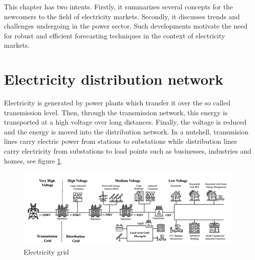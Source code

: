 
This chapter has two intents. Firstly, it summarizes several concepts for the newcomers to the field of electricity markets. Secondly, it discusses trends and challenges undergoing in the power sector. Such developments motivate the need for robust and efficient forecasting techniques in the context of electricity markets.


\section{Electricity distribution network}
Electricity is generated by power plants which transfer it over the so called transmission level. Then, through the transmission network, this energy is transported at a high voltage over long distances. Finally, the voltage is reduced and the energy is moved into the distribution network. In a nutshell, transmision lines carry electric power from stations to substations while distribution lines carry electricity from substations to load points such as businesses, industries and homes, see figure \ref{electricity_network}.

\begin{figure}[!h]
    \includegraphics[width=\textwidth]{images/electricity_network.png}
    \caption{Electricity grid \cite{haben2021review}}
    \label{electricity_network}
\end{figure}


